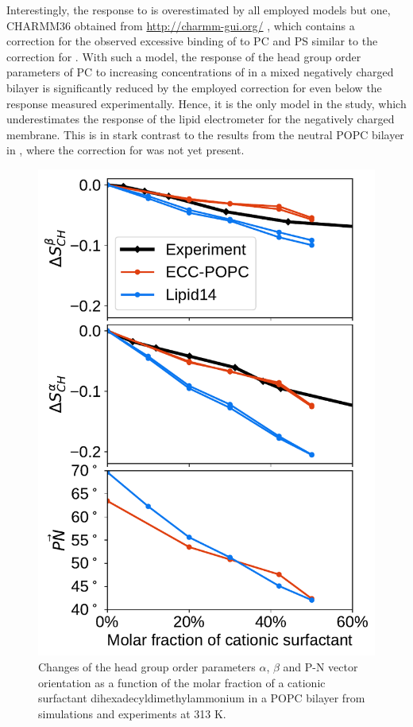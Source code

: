Interestingly, the response to  is overestimated by all employed models but one, 
CHARMM36 obtained from \url{http://charmm-gui.org/} \citep{jo08, lee15},
which contains a correction for the observed excessive binding of  to PC and PS similar to the correction for  \citep{venable13}. 
With such a model, the response of the head group order parameters of PC 
to increasing concentrations of  in a mixed negatively charged bilayer
is significantly reduced by the employed correction for 
even below the response measured experimentally. 
Hence, it is the only model in the study,
which underestimates the response of the lipid electrometer for the negatively charged membrane. 
This is in stark contrast to the results from the neutral POPC bilayer in \citep{catte16}, 
where the correction for  was not yet present.



\begin{figure}[tb!] 
  \centering 
  \includegraphics[width=\figwidth]{../img/ecc_popc/PN_angle_OrdPars-A-B_L14-ECCL17_q80_sig89_surf.pdf} 
  \caption{\label{OrderParameterCHANGESsurf} 
    Changes of the head group order parameters $\alpha$, $\beta$ and P-N vector orientation as a function of 
    the molar fraction of a cationic surfactant dihexadecyldimethylammonium in a POPC bilayer 
    from simulations and experiments \citep{scherer89} at 313 K.
  } 
\end{figure} 

